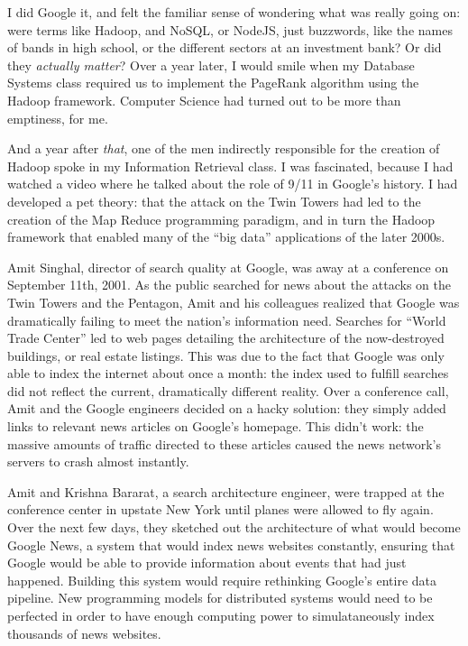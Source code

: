 \documentclass[12pt]{article}
\begin{document}
I did Google it, and felt the familiar sense of wondering what was really going
on: were terms like Hadoop, and NoSQL, or NodeJS, just buzzwords, like the names
of bands in high school, or the different sectors at an investment bank?  Or did
they \textit{actually matter}?  Over a year later, I would smile when my Database Systems class
required us to implement the PageRank algorithm using the Hadoop framework.
Computer Science had turned out to be more than emptiness, for me.

And a year after \textit{that}, one of the men indirectly responsible for the
creation of Hadoop spoke in my Information Retrieval class.  I was fascinated,
because I had watched a video where he talked about the role of 9/11 in Google's
history.  I had developed a pet theory: that the attack on the Twin Towers had
led to the creation of the Map Reduce programming paradigm, and in turn the
Hadoop framework that enabled many of the ``big data'' applications of the later
2000s.

Amit Singhal, director of search quality at Google, was away at a conference on
September 11th, 2001. As the public searched for news about the attacks on the
Twin Towers and the Pentagon, Amit and his colleagues realized that Google was
dramatically failing to meet the nation's information need. Searches for ``World
Trade Center'' led to web pages detailing the architecture of the now-destroyed
buildings, or real estate listings.  This was due to the fact that Google was
only able to index the internet about once a month: the index used to fulfill
searches did not reflect the current, dramatically different reality.  Over a
conference call, Amit and the Google engineers decided on a hacky solution: they
simply added links to relevant news articles on Google's homepage.  This didn't
work: the massive amounts of traffic directed to these articles caused the news
network's servers to crash almost instantly.

Amit and Krishna Bararat, a search architecture engineer, were trapped at the
conference center in upstate New York until planes were allowed to fly again.
Over the next few days, they sketched out the architecture of what would become
Google News, a system that would index news websites constantly, ensuring that
Google would be able to provide information about events that had just happened.
Building this system would require rethinking Google's entire data pipeline.
New programming models for distributed systems would need to be perfected in
order to have enough computing power to simulataneously index thousands of news
websites.
\end{document}
